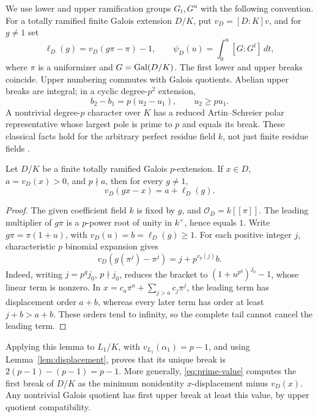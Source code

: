 We use lower and upper ramification groups \(G_t,G^u\) with the
following convention. For a totally ramified finite Galois
extension \(D/K\), put \(v_D=[D:K]v\), and for \(g\ne1\) set
\[
 \ell_D(g)=v_D(g\pi-\pi)-1,
 \qquad
 \psi_D(u)=\int_0^u[G:G^t]\,dt ,
\]
where \(\pi\) is a uniformizer and \(G=\operatorname{Gal}(D/K)\).
The first lower and upper breaks coincide. Upper numbering
commutes with Galois quotients. Abelian upper breaks are integral;
in a cyclic degree-\(p^2\) extension,
\begin{equation}\label{eq:herbrand-two}
 b_2-b_1=p(u_2-u_1),\qquad u_2\ge p u_1.
\end{equation}
A nontrivial degree-\(p\) character over \(K\) has a reduced
Artin--Schreier polar representative whose largest pole is prime
to \(p\) and equals its break. These classical facts hold for the
arbitrary perfect residue field \(k\), not just finite residue
fields \cite[Section 2]{elder2025artin}.

\begin{lemma}\label{lem:prime-value}
Let \(D/K\) be a finite totally ramified Galois \(p\)-extension.
If \(x\in D\), \(a=v_D(x)>0\), and \(p\nmid a\), then for every
\(g\ne1\),
\begin{equation}\label{eq:prime-value}
 v_D(gx-x)=a+\ell_D(g).
\end{equation}
\end{lemma}

\begin{proof}
The given coefficient field \(k\) is fixed by \(g\), and
\(\mathcal O_D=k[[\pi]]\). The leading multiplier of \(g\pi\)
is a \(p\)-power root of unity in \(k^\times\), hence equals \(1\).
Write \(g\pi=\pi(1+u)\), with \(v_D(u)=b=\ell_D(g)\ge1\).
For each positive integer \(j\), characteristic \(p\) binomial
expansion gives
\begin{equation}\label{eq:monomial-displacement}
 v_D(g(\pi^j)-\pi^j)=j+p^{v_p(j)}b.
\end{equation}
Indeed, writing \(j=p^qj_0\), \(p\nmid j_0\), reduces the bracket
to \((1+u^{p^q})^{j_0}-1\), whose linear term is nonzero.
In \(x=c_a\pi^a+\sum_{j>a}c_j\pi^j\), the leading term has
displacement order \(a+b\), whereas every later term has order
at least \(j+b>a+b\). These orders tend to infinity, so the
complete tail cannot cancel the leading term.
\end{proof}

Applying this lemma to \(L_1/K\), with
\(v_{L_1}(\alpha_1)=p-1\), and using
Lemma~\ref{lem:displacement}, proves that its unique break is
\(2(p-1)-(p-1)=p-1\).
More generally, \eqref{eq:prime-value} computes the first break
of \(D/K\) as the minimum nonidentity \(x\)-displacement minus
\(v_D(x)\). Any nontrivial Galois quotient has first upper break
at least this value, by upper quotient compatibility.
